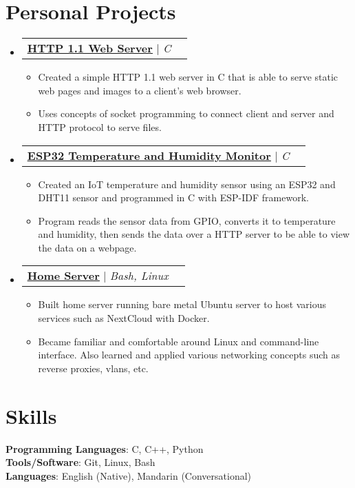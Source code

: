 \documentclass[letterpaper,12pt]{article}
\makeatletter
\newcommand{\resumeItem}[1]{
  \item\small{
    {#1 \vspace{-2pt}}
  }
}
\newcommand{\resumeProjectHeading}[2]{
    \item
    \begin{tabular*}{0.97\textwidth}{l@{\extracolsep{\fill}}r}
      \small#1 & #2 \\
    \end{tabular*}\vspace{-7pt}
}
\newcommand{\resumeSubHeadingListStart}{\begin{itemize}[leftmargin=0.15in, label={}]}
\newcommand{\resumeSubHeadingListEnd}{\end{itemize}}
\newcommand{\resumeItemListStart}{\begin{itemize}}
\newcommand{\resumeItemListEnd}{\end{itemize}\vspace{-5pt}}
\makeatother
\begin{document}
\section{Personal Projects}
    \resumeSubHeadingListStart
      \resumeProjectHeading
      {\textbf{\href{https://github.com/jamesyoung-15/http-server}{\underline {HTTP 1.1 Web Server}}} $|$ \emph{C}}{}
      \resumeItemListStart
        \resumeItem{\normalsize{Created a simple HTTP 1.1 web server in C that is able to serve static web pages and images to a client's web browser.}} 
        \resumeItem{\normalsize{Uses concepts of socket programming to connect client and server and HTTP protocol to serve files.}}
      \resumeItemListEnd
      \resumeProjectHeading
      {\textbf{\href{https://github.com/jamesyoung-15/esp32-dht11-serve}{\underline {ESP32 Temperature and Humidity Monitor}}} $|$ \emph{C}}{}
      \resumeItemListStart
        \resumeItem{\normalsize{Created an IoT temperature and humidity sensor using an ESP32 and DHT11 sensor and programmed in C with ESP-IDF framework.}}
        \resumeItem{\normalsize{Program reads the sensor data from GPIO, converts it to temperature and humidity, then sends the data over a HTTP server to be able to view the data on a webpage.}}
      \resumeItemListEnd
      \resumeProjectHeading
          {\textbf{\href{https://github.com/jamesyoung-15/homeserver}{\underline {Home Server}}} $|$ \emph{Bash, Linux}}{}
          \resumeItemListStart
            \resumeItem{\normalsize{Built home server running bare metal Ubuntu server to host various services such as NextCloud with Docker.}}
            \resumeItem{\normalsize{Became familiar and comfortable around Linux and command-line interface. Also learned and applied various networking concepts such as reverse proxies, vlans, etc.}}
      \resumeItemListEnd

    \resumeSubHeadingListEnd



%
\section{Skills}
 \begin{itemize}[leftmargin=0.15in, label={}]
    \small{\item{
     \textbf{Programming Languages}{: C, C++, Python} \\
     \textbf{Tools/Software}{: Git, Linux, Bash} \\
     \textbf{Languages}{: English (Native), Mandarin (Conversational)} \\
    }}
 \end{itemize}
\end{document}

